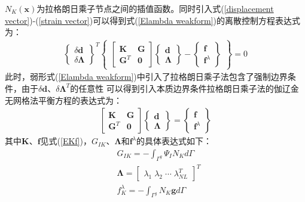 $N_K(\pmb{x})$为拉格朗日乘子节点之间的插值函数。同时引入式(\ref{displacement vector})-(\ref{strain vector})可以得到式(\ref{Elambda weakform})的离散控制方程表达式为：
\begin{equation}
\begin{split}
  \left\{\begin{matrix}\delta\pmb{d}\\\delta\pmb{\Lambda}\end{matrix}\right\}^T
  \left\{\begin{matrix}
  \left[\begin{matrix}\pmb{K}&\pmb{G}\\\pmb{G}^T&\pmb{0}\end{matrix}\right]
  \left\{\begin{matrix}\pmb{d}\\\pmb{\Lambda}\end{matrix}\right\}-
  \left\{\begin{matrix}\pmb{f}\\\pmb{f}^{\lambda}\end{matrix}\right\}
  \end{matrix}\right\}=0
\end{split}
\end{equation}
此时，弱形式(\ref{Elambda weakform})中引入了拉格朗日乘子法包含了强制边界条件，由于$\delta{\pmb{d}}$、$\delta\pmb{\Lambda}^T$的任意性
可以得到引入本质边界条件拉格朗日乘子法的伽辽金无网格法平衡方程的表达式为：
\begin{equation}
\begin{split}
    \left[\begin{matrix}\pmb{K}&\pmb{G}\\\pmb{G}^T&\pmb{0}\end{matrix}\right]
    \left\{\begin{matrix}\pmb{d}\\\pmb{\Lambda}\end{matrix}\right\}=
    \left\{\begin{matrix}\pmb{f}\\\pmb{f}^{\lambda}\end{matrix}\right\}
\end{split}
\end{equation}
其中$\pmb{K}$、$\pmb{f}$见式(\ref{EKf})，$G_{IK}$、$\pmb{\Lambda}$和$\pmb{f}^{\lambda}$的具体表达式如下：
\begin{equation}
\begin{split}
    &G_{IK}=-\int_{\Gamma^g}\Psi_IN_Kd\Gamma\\
    &\pmb{\Lambda}= \left[\begin{matrix}\lambda_1\;\lambda_2\;\dotsb\;\lambda_{N\!L}^T\end{matrix}\right]^T\\
    &f_K^{\lambda}=-\int_{\Gamma^g}N_K\pmb{g}d\Gamma
\end{split}
\end{equation}\par
